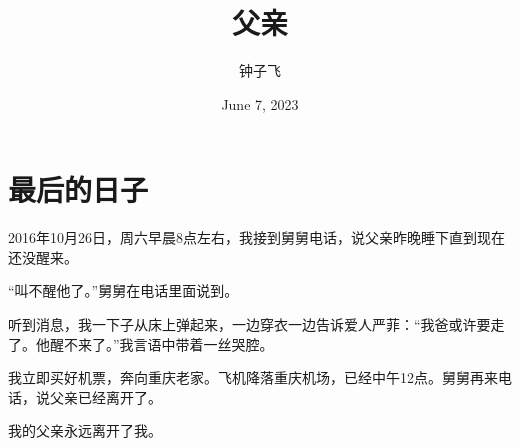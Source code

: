 \documentclass[11pt, oneside]{article}   	%
\title{父亲}
\author{钟子飞}
\date{June 7, 2023}							%
\begin{document}

\maketitle


\section{最后的日子}
2016年10月26日，周六早晨8点左右，我接到舅舅电话，说父亲昨晚睡下直到现在还没醒来。

“叫不醒他了。”舅舅在电话里面说到。

听到消息，我一下子从床上弹起来，一边穿衣一边告诉爱人严菲：“我爸或许要走了。他醒不来了。”我言语中带着一丝哭腔。

我立即买好机票，奔向重庆老家。飞机降落重庆机场，已经中午12点。舅舅再来电话，说父亲已经离开了。

我的父亲永远离开了我。
\end{document}
